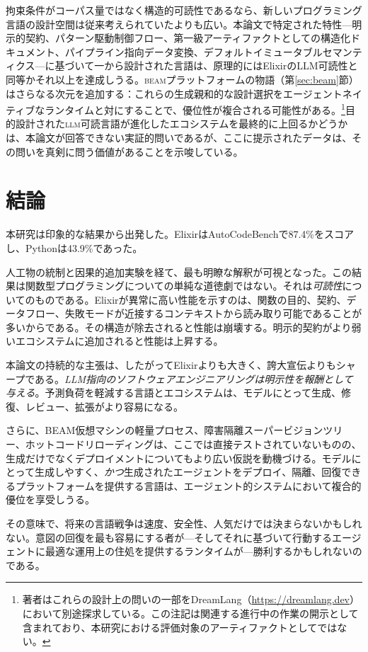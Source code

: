 \documentclass[11pt]{article}
\newcommand{\acb}{AutoCodeBench}
\newcommand{\elixir}{Elixir}
\newcommand{\pythonlang}{Python}
\newcommand{\acro}[1]{\textsc{\MakeLowercase{#1}}}
\begin{document}
拘束条件がコーパス量ではなく構造的可読性であるなら、新しいプログラミング言語の設計空間は従来考えられていたよりも広い。本論文で特定された特性---明示的契約、パターン駆動制御フロー、第一級アーティファクトとしての構造化ドキュメント、パイプライン指向データ変換、デフォルトイミュータブルセマンティクス---に基づいて一から設計された言語は、原理的には\elixir{}のLLM可読性と同等かそれ以上を達成しうる。\acro{BEAM}プラットフォームの物語（第\ref{sec:beam}節）はさらなる次元を追加する：これらの生成親和的な設計選択をエージェントネイティブなランタイムと対にすることで、優位性が複合される可能性がある。\footnote{著者はこれらの設計上の問いの一部をDreamLang（\url{https://dreamlang.dev}）において別途探求している。この注記は関連する進行中の作業の開示として含まれており、本研究における評価対象のアーティファクトとしてではない。}目的設計された\acro{LLM}可読言語が進化したエコシステムを最終的に上回るかどうかは、本論文が回答できない実証的問いであるが、ここに提示されたデータは、その問いを真剣に問う価値があることを示唆している。

\section{結論}

本研究は印象的な結果から出発した。\elixir{}は\acb{}で87.4\%をスコアし、\pythonlang{}は43.9\%であった。

人工物の統制と因果的追加実験を経て、最も明瞭な解釈が可視となった。この結果は関数型プログラミングについての単純な道徳劇ではない。それは\emph{可読性}についてのものである。\elixir{}が異常に高い性能を示すのは、関数の目的、契約、データフロー、失敗モードが近接するコンテキストから読み取り可能であることが多いからである。その構造が除去されると性能は崩壊する。明示的契約がより弱いエコシステムに追加されると性能は上昇する。

本論文の持続的な主張は、したがって\elixir{}よりも大きく、誇大宣伝よりもシャープである。\emph{LLM指向のソフトウェアエンジニアリングは明示性を報酬として与える}。予測負荷を軽減する言語とエコシステムは、モデルにとって生成、修復、レビュー、拡張がより容易になる。

さらに、BEAM仮想マシンの軽量プロセス、障害隔離スーパービジョンツリー、ホットコードリローディングは、ここでは直接テストされていないものの、生成だけでなくデプロイメントについてもより広い仮説を動機づける。モデルにとって生成しやすく、\emph{かつ}生成されたエージェントをデプロイ、隔離、回復できるプラットフォームを提供する言語は、エージェント的システムにおいて複合的優位を享受しうる。

その意味で、将来の言語戦争は速度、安全性、人気だけでは決まらないかもしれない。意図の回復を最も容易にする者が---そしてそれに基づいて行動するエージェントに最適な運用上の住処を提供するランタイムが---勝利するかもしれないのである。
\end{document}
